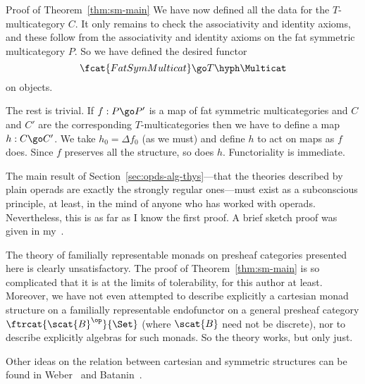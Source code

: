 \begin{prooflike}{Proof of Theorem~\ref{thm:sm-main}}
We have now defined all the data for the $T$-multicategory $C$.  It only
remains to check the associativity and identity axioms, and these follow
from the associativity and identity axioms on the fat symmetric
multicategory $P$.  So we have defined the desired functor
\[
\fcat{FatSymMulticat} \go T\hyph\Multicat
\]
on objects.

The rest is trivial.  If $f: P \go P'$ is a map of fat symmetric
multicategories and $C$ and $C'$ are the corresponding $T$-multicategories
then we have to define a map $h: C \go C'$.  We take $h_0 = \Delta f_0$ (as
we must) and define $h$ to act on maps as $f$ does.  Since $f$ preserves
all the structure, so does $h$.  Functoriality is immediate.  
\done
\end{prooflike}%
%
%
%
%
%
%




\begin{notes}

The main result of Section~\ref{sec:opds-alg-thys}---that the theories
described by plain operads are exactly the strongly regular ones---must
exist as a subconscious principle, at least, in the mind of anyone who has
worked with operads.  Nevertheless, this is as far as I know the first
proof.  A brief sketch proof was given in my~\cite[4.6]{GOM}.

The theory of familially representable monads on presheaf categories
presented here is clearly unsatisfactory.  The proof of
Theorem~\ref{thm:sm-main} is so complicated that it is at the limits of
tolerability, for this author at least.  Moreover, we have not even
attempted to describe explicitly a cartesian monad structure on a
familially representable endofunctor on a general presheaf category
$\ftrcat{\scat{B}^\op}{\Set}$ (where $\scat{B}$ need not be discrete), nor
to describe explicitly algebras for such monads.  So the theory works, but
only just.

Other ideas on the relation between cartesian and symmetric structures can
be found in Weber~\cite{Web}%
%
%
and Batanin~\cite{BatCSO}.%
%
%



\end{notes}
